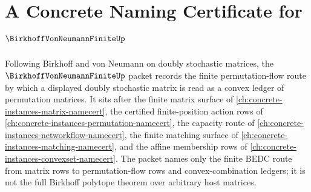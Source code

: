 \chapter{A Concrete Naming Certificate for $\BirkhoffVonNeumannFiniteUp$}
\label{ch:concrete-instances-birkhoff-von-neumann-finite-namecert}

Following Birkhoff and von Neumann on doubly stochastic matrices, the $\BirkhoffVonNeumannFiniteUp$ packet records the finite permutation-flow route by which a displayed doubly stochastic matrix is read as a convex ledger of permutation matrices. It sits after the finite matrix surface of \autoref{ch:concrete-instances-matrix-namecert}, the certified finite-position action rows of \autoref{ch:concrete-instances-permutation-namecert}, the capacity route of \autoref{ch:concrete-instances-networkflow-namecert}, the finite matching surface of \autoref{ch:concrete-instances-matching-namecert}, and the affine membership rows of \autoref{ch:concrete-instances-convexset-namecert}. The packet names only the finite BEDC route from matrix rows to permutation-flow rows and convex-combination ledgers; it is not the full Birkhoff polytope theorem over arbitrary host matrices.

